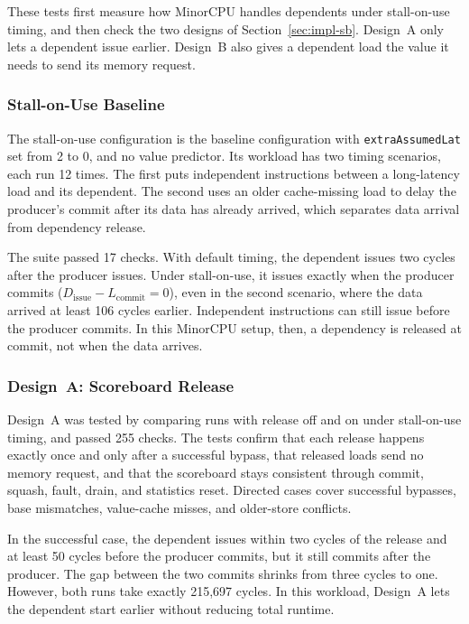 These tests first measure how MinorCPU handles dependents under
stall-on-use timing, and then check the two designs of
Section~\ref{sec:impl-sb}. Design~A only lets a dependent issue
earlier. Design~B also gives a dependent load the value it needs to
send its memory request.

\subsubsection{Stall-on-Use Baseline}
\label{subsubsec:stall-on-use-validation}

The stall-on-use configuration is the baseline configuration with
\texttt{extraAssumedLat} set from 2 to 0, and no value predictor. Its
workload has two timing scenarios, each run 12 times. The first puts
independent instructions between a long-latency load and its
dependent. The second uses an older cache-missing load to delay the
producer's commit after its data has already arrived, which separates
data arrival from dependency release.

The suite passed 17 checks. With default timing, the dependent issues
two cycles after the producer issues. Under stall-on-use, it issues
exactly when the producer commits
(\(D_{\mathrm{issue}}-L_{\mathrm{commit}}=0\)), even in the second
scenario, where the data arrived at least 106 cycles earlier.
Independent instructions can still issue before the producer commits.
In this MinorCPU setup, then, a dependency is released at commit, not
when the data arrives.

\subsubsection{Design~A: Scoreboard Release}
\label{subsubsec:scoreboard-release-validation}

Design~A was tested by comparing runs with release off and on under
stall-on-use timing, and passed 255 checks. The tests confirm that
each release happens exactly once and only after a successful bypass,
that released loads send no memory request, and that the scoreboard
stays consistent through commit, squash, fault, drain, and statistics
reset. Directed cases cover successful bypasses, base mismatches,
value-cache misses, and older-store conflicts.

In the successful case, the dependent issues within two cycles of the
release and at least 50 cycles before the producer commits, but it
still commits after the producer. The gap between the two commits
shrinks from three cycles to one. However, both runs take exactly
215,697 cycles. In this workload, Design~A lets the dependent start
earlier without reducing total runtime.

